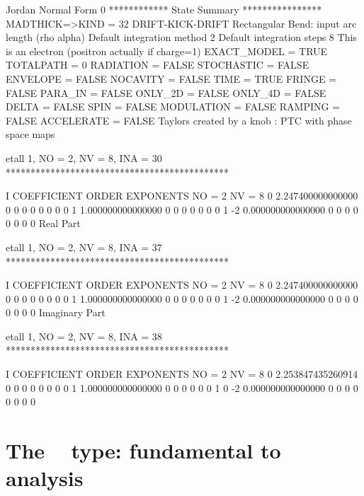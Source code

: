 \documentclass{hitec}     %
\begin{document}
{\begin{code}
  Jordan Normal Form            0
 ************ State Summary ****************
 MADTHICK=>KIND =   32  DRIFT-KICK-DRIFT
  Rectangular Bend: input arc length (rho alpha)
  Default integration method     2
  Default integration steps      8
 This is an electron (positron actually if charge=1)
       EXACT_MODEL =  TRUE
       TOTALPATH   =     0
       RADIATION   =  FALSE
       STOCHASTIC  =  FALSE
       ENVELOPE    =  FALSE
       NOCAVITY    =  FALSE
       TIME        =  TRUE
       FRINGE      =  FALSE
       PARA_IN     =  FALSE
       ONLY_2D     =  FALSE
       ONLY_4D     =  FALSE
       DELTA       =  FALSE
       SPIN        =  FALSE
       MODULATION  =  FALSE
       RAMPING     =  FALSE
       ACCELERATE  =  FALSE
 Taylors created by a knob : PTC with phase space maps

 etall    1, NO =    2, NV =    8, INA =   30
 *********************************************

    I  COEFFICIENT          ORDER   EXPONENTS
      NO =     2      NV =     8
   0   2.247400000000000       0  0  0  0  0  0  0  0
   1   1.000000000000000       0  0  0  0  0  0  0  1
    -2   0.000000000000000       0  0  0  0  0  0  0  0
  Real Part

 etall    1, NO =    2, NV =    8, INA =   37
 *********************************************

    I  COEFFICIENT          ORDER   EXPONENTS
      NO =     2      NV =     8
   0   2.247400000000000       0  0  0  0  0  0  0  0
   1   1.000000000000000       0  0  0  0  0  0  0  1
    -2   0.000000000000000       0  0  0  0  0  0  0  0
  Imaginary Part

 etall    1, NO =    2, NV =    8, INA =   38
 *********************************************

    I  COEFFICIENT          ORDER   EXPONENTS
      NO =     2      NV =     8
   0   2.253847435260914       0  0  0  0  0  0  0  0
   1   1.000000000000000       0  0  0  0  0  0  1  0
    -2   0.000000000000000       0  0  0  0  0  0  0  0
\end{code}

\section{The  ~ type: fundamental to analysis}
\label{s:cdamap}







}
\end{document}
